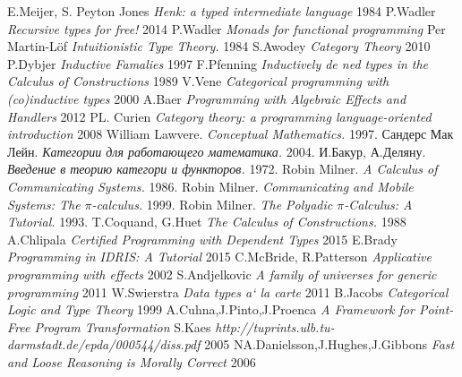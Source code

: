 \documentclass[11pt,oneside]{article}
\begin{document}
\newpage
\begin{thebibliography}{9}

       E.Meijer, S. Peyton Jones \textit{Henk: a typed intermediate language} 1984
  P.Wadler \textit{Recursive types for free!} 2014 %
    P.Wadler \textit{Monads for functional programming}
        Per Martin-Löf \textit{Intuitionistic Type Theory.} 1984
     S.Awodey \textit{Category Theory} 2010
     P.Dybjer \textit{Inductive Famalies} 1997
   F.Pfenning \textit{Inductively de ned types in the Calculus of Constructions} 1989
       V.Vene \textit{Categorical programming with (co)inductive types} 2000
       A.Baer \textit{Programming with Algebraic Effects and Handlers} 2012
    PL. Curien \textit{Category theory: a programming language-oriented introduction} 2008
    William Lawvere. \textit{Conceptual Mathematics.} 1997.
     Сандерс Мак Лейн. \textit{Категории для работающего математика.} 2004.
      И.Бакур, А.Деляну. \textit{Введение в теорию категори и функторов.} 1972.
       Robin Milner. \textit{A Calculus of Communicating Systems.} 1986.
     Robin Milner. \textit{Communicating and Mobile Systems: The $\pi$-calculus.} 1999.
     Robin Milner. \textit{The Polyadic $\pi$-Calculus: A Tutorial.} 1993.
    T.Coquand, G.Huet \textit{The Calculus of Constructions.} 1988
     A.Chlipala \textit{Certified Programming with Dependent Types} 2015
      E.Brady \textit{Programming in IDRIS: A Tutorial} 2015
 C.McBride, R.Patterson \textit{Applicative programming with effects} 2002
   S.Andjelkovic \textit{A family of universes for generic programming} 2011
   W.Swierstra \textit{Data types a` la carte} 2011
   B.Jacobs \textit{Categorical Logic and Type Theory} 1999
  A.Cuhna,J.Pinto,J.Proenca \textit{A Framework for Point-Free Program Transformation}
       S.Kaes \textit{http://tuprints.ulb.tu-darmstadt.de/epda/000544/diss.pdf} 2005
        NA.Danielsson,J.Hughes,J.Gibbons \textit{Fast and Loose Reasoning is Morally Correct} 2006

\end{thebibliography}
\end{document}

